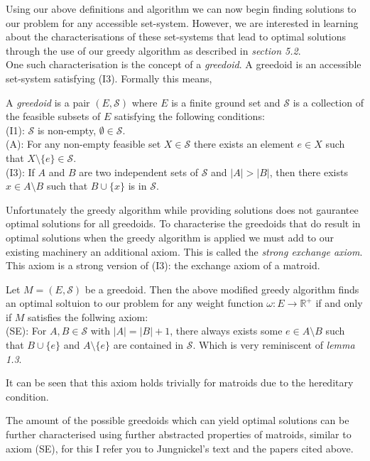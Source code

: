 \documentclass[../main.tex]{subfiles}
\begin{document}
\noindent Using our above definitions and algorithm we can now begin finding solutions to our problem for any accessible set-system. However, we are interested in learning about the characterisations of these set-systems that lead to optimal solutions through the use of our greedy algorithm as described in \textit{section 5.2}.\\
One such characterisation is the concept of a \textit{greedoid}. A greedoid is an accessible set-system satisfying (I3). Formally this means,
\begin{defn}
A \textit{greedoid} is a pair $(E,\mathcal{S})$ where $E$ is a finite ground set and $\mathcal{S}$ is a collection of the feasible subsets of $E$ satisfying the following conditions:\\
(I1): $\mathcal{S}$ is non-empty, $\emptyset \in \mathcal{S}.$\\
(A):  For any non-empty feasible set $X \in \mathcal{S}$ there exists an element $e \in X$ such that $X \setminus \{e\} \in \mathcal{S}.$\\
(I3): If $ A $ and $ B $ are two independent sets of $\mathcal{S}$ and $|A|>|B|$, then there exists $x \in A \setminus B$ such that $B \cup \{ x \}$ is in $\mathcal{S}.$
\end{defn}
Unfortunately the greedy algorithm while providing solutions does not gaurantee optimal solutions for all greedoids. To characterise the greedoids that do result in optimal solutions when the greedy algorithm is applied we must add to our existing machinery an additional axiom. This is called the \textit{strong exchange axiom}. This axiom is a strong version of (I3): the exchange axiom of a matroid. 
\begin{prop}
Let $M=(E,\mathcal{S})$ be a greedoid. Then the above modified greedy algorithm  finds an optimal soltuion to our problem for any weight function $\omega:E \longrightarrow \mathbb{R^+}$ if and only if $M$ satisfies the follwing axiom:\\
(SE): For $A,B \in \mathcal{S}$ with $|A|=|B|+1$, there always exists some $e \in A \setminus B$ such that $B \cup \{e\}$ and $A \setminus \{e\}$ are contained in $\mathcal{S}.$ Which is very reminiscent of \textit{lemma 1.3}.
\end{prop}
\begin{rem}
It can be seen that this axiom holds trivially for matroids due to the hereditary condition.
\end{rem}
\begin{rem}
The amount of the possible greedoids which can yield optimal solutions can be further characterised using further abstracted properties of matroids, similar to axiom (SE), for this I refer you to Jungnickel's text\cite{jungnickel} and the papers cited above.
\end{rem}
\end{document}
